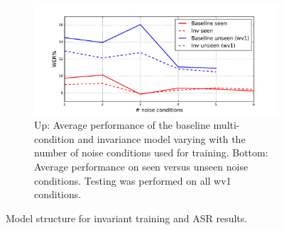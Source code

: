 \documentclass{article}
\begin{document}
\begin{figure}
\begin{subfigure}[b]{0.7\linewidth}
        \includegraphics[width=\linewidth]{wer_seen_unseen.pdf}
        \caption{Up: Average performance of the baseline multi-condition and invariance model varying with  the number of noise
            conditions used for training. Bottom: Average performance on seen versus unseen noise conditions.
            Testing was performed on all wv1 conditions.
            }
        \label{fig:results}
    \end{subfigure}
    \caption{Model structure for invariant training and ASR results.}
\end{figure}



    

    
\end{document}

